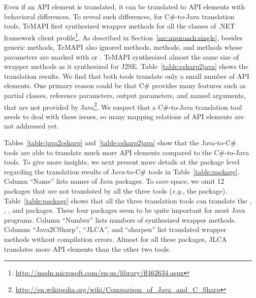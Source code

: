 Even if an API element is translated, it can be translated to API elements with behavioral differences. To reveal such differences, for C\#-to-Java translation tools, TeMAPI first synthesized wrapper methods for all the classes of .NET framework client profile\footnote{\url{http://msdn.microsoft.com/en-us/library/ff462634.aspx}}. As described in Section~\ref{sec:approach:single}, besides generic methods, TeMAPI also ignored  methods,  methods, and methods whose parameters are marked with  or . TeMAPI synthesized almost the same size of wrapper methods as it synthesized for J2SE. Table~\ref{table:csharp2java} shows the translation results. We find that both tools translate only a small number of API elements. One primary reason could be that C\# provides many features such as partial classes, reference parameters, output parameters, and named arguments, that are not provided by Java\footnote{\url{http://en.wikipedia.org/wiki/Comparison_of_Java_and_C_Sharp}}. We suspect that a C\#-to-Java translation tool needs to deal with these issues, so many mapping relations of API elements are not addressed yet.

Tables~\ref{table:java2csharp} and~\ref{table:csharp2java} show that the Java-to-C\# tools are able to translate much more API elements compared to the C\#-to-Java tools. To give more insights, we next present more details at the package level regarding the translation results of Java-to-C\# tools in Table~\ref{table:package}. Column ``Name'' lists names of Java packages. To save space, we omit 12 packages that are not translated by all the three tools (\emph{e.g.}, the  package). Table~\ref{table:package} shows that all the three translation tools can translate the , , , and  packages. These four packages seem to be quite important for most Java programs. Column ``Number'' lists numbers of synthesized wrapper methods. Columns ``Java2CSharp'', ``JLCA'', and ``sharpen'' list translated wrapper methods without compilation errors. Almost for all these packages, JLCA translates more API elements than the other two tools.

